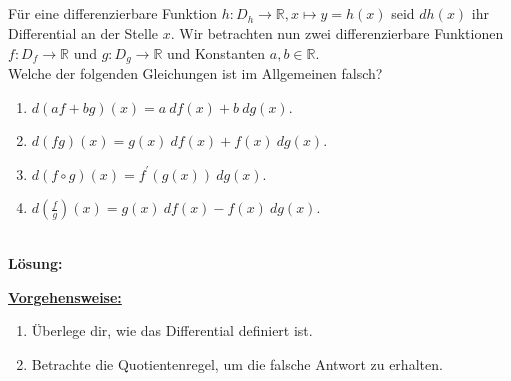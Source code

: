 \subsection*{}
Für eine differenzierbare Funktion $ h:D_h \to \mathbb{R}, x \mapsto y = h(x) $ seid $ dh(x) $ ihr Differential an der Stelle $ x $.
Wir betrachten nun zwei differenzierbare Funktionen $ f :D_f \to \mathbb{R} $ und $ g: D_g \to \mathbb{R} $ und Konstanten $ a,b \in \mathbb{R} $.\\
Welche der folgenden Gleichungen ist im Allgemeinen falsch?
\renewcommand{\labelenumi}{(\alph{enumi})}
\begin{enumerate}
	\item 
	$ d(af +bg)(x) = a \ df(x) + b \ d g(x) $.
	\item
	$ d(fg)(x) = g(x) \ df(x) + f(x) \ dg(x) $.
	\item
	$ d(f\circ g) (x) = f^\prime(g(x)) \ dg(x) $.
	\item
	$ d \left( \frac{f}{g} \right)(x) = g(x) \ df(x) - f(x) \ dg(x) $.
\end{enumerate}

\ \\
\textbf{Lösung:}
\begin{mdframed}
	\underline{\textbf{Vorgehensweise:}}
	\renewcommand{\labelenumi}{\theenumi.}
	\begin{enumerate}
		\item Überlege dir, wie das Differential definiert ist.
		\item Betrachte die Quotientenregel, um die falsche Antwort zu erhalten.
	\end{enumerate}
\end{mdframed}

